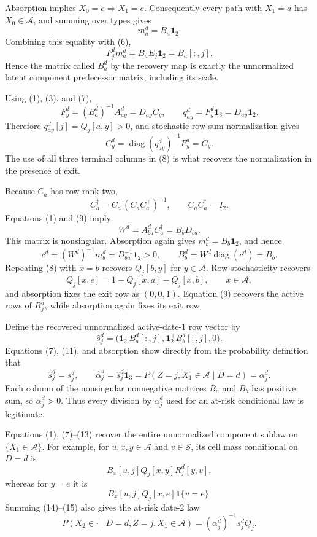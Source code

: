 Absorption implies \(X_0=e\Rightarrow X_1=e\).  Consequently every path with \(X_1=a\) has \(X_0\in\mathcal A\), and summing over types gives
\[
 m_a^d=B_a\mathbf 1_2.
\]
Combining this equality with (6),
\[
 P_j^dm_a^d=B_aE_j\mathbf 1_2=B_a[:,j].                     \tag{7}
\]
Hence the matrix called \(B_a^d\) by the recovery map is exactly the unnormalized latent component predecessor matrix, including its scale.

Using (1), (3), and (7),
\[
 F_y^d=(B_a^d)^{-1}A_{ay}^d=D_{ay}C_y,
 \qquad q_{ay}^d=F_y^d\mathbf 1_3=D_{ay}\mathbf 1_2.        \tag{8}
\]
Therefore \(q_{ay}^d[j]=Q_j[a,y]>0\), and stochastic row-sum normalization gives
\[
 C_y^d=\operatorname{diag}(q_{ay}^d)^{-1}F_y^d=C_y.          \tag{9}
\]
The use of all three terminal columns in (8) is what recovers the normalization in the presence of exit.

Because \(C_a\) has row rank two,
\[
 C_a^\dagger=C_a^\top(C_aC_a^\top)^{-1},\qquad
 C_aC_a^\dagger=I_2.
\]
Equations (1) and (9) imply
\[
 W^d=A_{ba}^dC_a^\dagger=B_bD_{ba}.                         \tag{10}
\]
This matrix is nonsingular.  Absorption again gives \(m_b^d=B_b\mathbf 1_2\), and hence
\[
 c^d=(W^d)^{-1}m_b^d=D_{ba}^{-1}\mathbf 1_2>0,
 \qquad B_b^d=W^d\operatorname{diag}(c^d)=B_b.              \tag{11}
\]
Repeating (8) with \(x=b\) recovers \(Q_j[b,y]\) for \(y\in\mathcal A\).  Row stochasticity recovers
\[
 Q_j[x,e]=1-Q_j[x,a]-Q_j[x,b],\qquad x\in\mathcal A,
\]
and absorption fixes the exit row as \((0,0,1)\).  Equation (9) recovers the active rows of \(R_j^d\), while absorption again fixes its exit row.

Define the recovered unnormalized active-date-\(1\) row vector by
\[
 \widehat s_j^d
 =\bigl(\mathbf 1_2^\top B_a^d[:,j],
          \mathbf 1_2^\top B_b^d[:,j],0\bigr).              \tag{12}
\]
Equations (7), (11), and absorption show directly from the probability definition that
\[
 \widehat s_j^d=s_j^d,
 \qquad \widehat\alpha_j^d=\widehat s_j^d\mathbf 1_3
 =P(Z=j,X_1\in\mathcal A\mid D=d)=\alpha_j^d.               \tag{13}
\]
Each column of the nonsingular nonnegative matrices \(B_a\) and \(B_b\) has positive sum, so \(\alpha_j^d>0\).  Thus every division by \(\alpha_j^d\) used for an at-risk conditional law is legitimate.

Equations (1), (7)--(13) recover the entire unnormalized component sublaw on \(\{X_1\in\mathcal A\}\).  For example, for \(u,x,y\in\mathcal A\) and \(v\in\mathcal S\), its cell mass conditional on \(D=d\) is
\[
 B_x[u,j]Q_j[x,y]R_j^d[y,v],                                \tag{14}
\]
whereas for \(y=e\) it is
\[
 B_x[u,j]Q_j[x,e]\mathbf 1\{v=e\}.                         \tag{15}
\]
Summing (14)--(15) also gives the at-risk date-\(2\) law
\[
 P(X_2\in\cdot\mid D=d,Z=j,X_1\in\mathcal A)
 =(\alpha_j^d)^{-1}s_j^dQ_j.                                \tag{16}
\]

